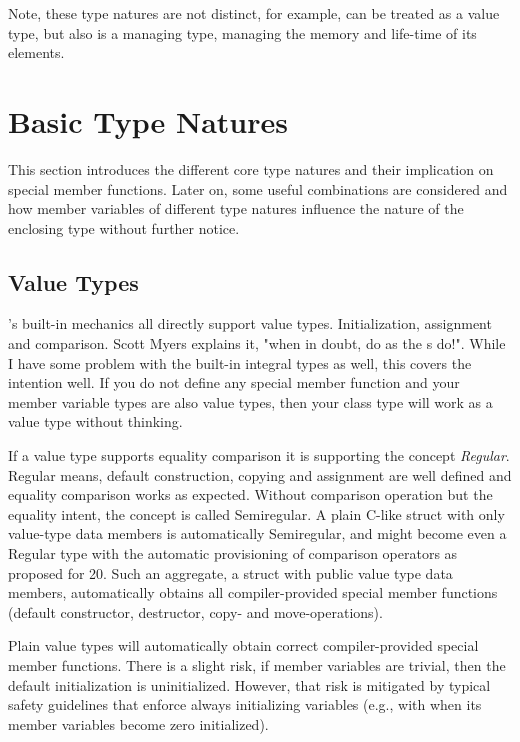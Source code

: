\documentclass[ebook,11pt,article]{memoir}
\begin{document}
Note, these type natures are not distinct, for example,  can be treated as a value type, but also is a managing type, managing the memory and life-time of its elements.

\section{Basic Type Natures}
This section introduces the different core type natures and their implication on special member functions. Later on, some useful combinations are considered and how member variables of different type natures influence the nature of the enclosing type without further notice.

\subsection{Value Types}
\Cpp{}'s built-in mechanics all directly support value types. Initialization, assignment and comparison. Scott Myers explains it, "when in doubt, do as the s do!"\cite{Meyers2005}. While I have some problem with the built-in integral types as well, this covers the intention well. If you do not define any special member function and your member variable types are also value types, then your class type will work as a value type without thinking.

If a value type supports equality comparison it is supporting the concept \emph{Regular}. Regular means, default construction, copying and assignment are well defined and equality comparison works as expected. Without comparison operation but the equality intent, the concept is called Semiregular. A plain C-like struct with only value-type data members is automatically Semiregular, and might become even a Regular type with the automatic provisioning of comparison operators as proposed for \Cpp{}20.
Such an aggregate, a struct with public value type data members, automatically obtains all compiler-provided special member functions (default constructor, destructor, copy- and move-operations).

Plain value types will automatically obtain correct compiler-provided special member functions.
There is a slight risk, if member variables are trivial, then the default initialization is uninitialized. 
However, that risk is mitigated by typical safety guidelines that enforce always initializing variables (e.g., with \tcode{\{\}} when its member variables become zero initialized).
\end{document}
